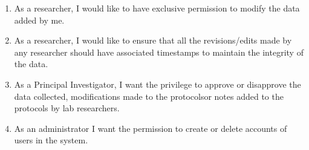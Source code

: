 \documentclass {article}
\begin{document}
{{\begin{enumerate}
\begin{itemize}
		\end{itemize}
		The above search criteria can be used for searching entire articles or only images. 
	\item As a researcher, I would like to have exclusive permission to modify the data added by me. 
	\item As a researcher, I would like to ensure that all the revisions/edits made by any researcher should have associated timestamps to maintain the integrity of the data. 
	\item As a Principal Investigator, I want the privilege to approve or disapprove the data collected, modifications made to the protocols\footnotemark[2] or notes added to the protocols by lab researchers. 
	\item As an administrator I want the permission to create or delete accounts of users in the system. 
\end{enumerate}
}}
\end{document}
